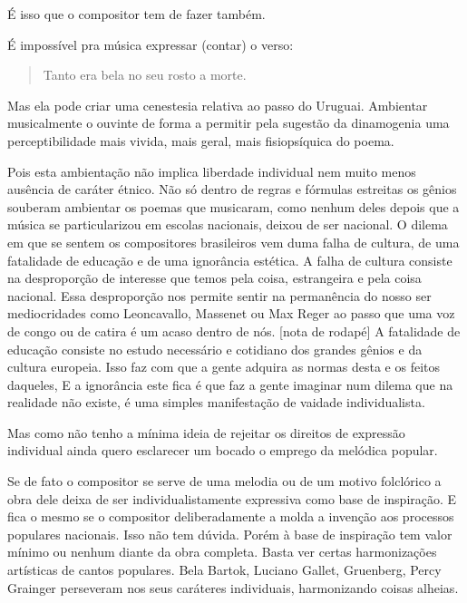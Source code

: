 É isso que o compositor tem de fazer também.

É impossível pra música expressar (contar) o verso:

\begin{verse}
Tanto era bela no seu rosto a morte.
\end{verse}

Mas ela pode criar uma cenestesia relativa ao passo do Uruguai.
Ambientar musicalmente o ouvinte de forma a permitir pela sugestão da
dinamogenia uma perceptibilidade mais vivida, mais geral, mais
fisiopsíquica do poema.

Pois esta ambientação não implica liberdade individual nem muito menos
ausência de caráter étnico. Não só dentro de regras e fórmulas estreitas
os gênios souberam ambientar os poemas que musicaram, como nenhum deles
depois que a música se particularizou em escolas nacionais, deixou de
ser nacional. O dilema em que se sentem os compositores brasileiros vem
duma falha de cultura, de uma fatalidade de educação e de uma ignorância
estética. A falha de cultura consiste na desproporção de interesse que
temos pela coisa, estrangeira e pela coisa nacional. Essa desproporção
nos permite sentir na permanência do nosso ser mediocridades como
Leoncavallo, Massenet ou Max Reger ao passo que uma voz de congo ou de
catira é um acaso dentro de nós. {[}nota de rodapé{]} A fatalidade de
educação consiste no estudo necessário e cotidiano dos grandes gênios e
da cultura europeia. Isso faz com que a gente adquira as normas desta e
os feitos daqueles, E a ignorância este fica é que faz a gente imaginar
num dilema que na realidade não existe, é uma simples manifestação de
vaidade individualista.

Mas como não tenho a mínima ideia de rejeitar os direitos de expressão
individual ainda quero esclarecer um bocado o emprego da melódica
popular.

Se de fato o compositor se serve de uma melodia ou de um motivo
folclórico a obra dele deixa de ser individualistamente expressiva como
base de inspiração. E fica o mesmo se o compositor deliberadamente a
molda a invenção aos processos populares nacionais. Isso não tem dúvida.
Porém à base de inspiração tem valor mínimo ou nenhum diante da obra
completa. Basta ver certas harmonizações artísticas de cantos populares.
Bela Bartok, Luciano Gallet, Gruenberg, Percy Grainger perseveram nos
seus caráteres individuais, harmonizando coisas alheias.

